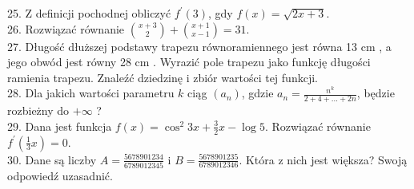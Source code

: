 \documentclass[10pt]{article}
\begin{document}
25. Z definicji pochodnej obliczyć \(f^{\prime}(3)\), gdy \(f(x)=\sqrt{2 x+3}\).\\
26. Rozwiązać równanie \(\binom{x+3}{2}+\binom{x+1}{x-1}=31\).\\
27. Długość dłuższej podstawy trapezu równoramiennego jest równa 13 cm , a jego obwód jest równy 28 cm . Wyrazić pole trapezu jako funkcję długości ramienia trapezu. Znaleźć dziedzinę i zbiór wartości tej funkcji.\\
28. Dla jakich wartości parametru \(k\) ciąg \(\left(a_{n}\right)\), gdzie \(a_{n}=\frac{n^{k}}{2+4+\ldots+2 n}\), będzie rozbieżny do \(+\infty\) ?\\
29. Dana jest funkcja \(f(x)=\cos ^{2} 3 x+\frac{3}{2} x-\log 5\). Rozwiązać równanie \(f^{\prime}\left(\frac{1}{3} x\right)=0\).\\
30. Dane są liczby \(A=\frac{5678901234}{6789012345}\) i \(B=\frac{5678901235}{6789012346}\). Która z nich jest większa? Swoją odpowiedź uzasadnić.
\end{document}
